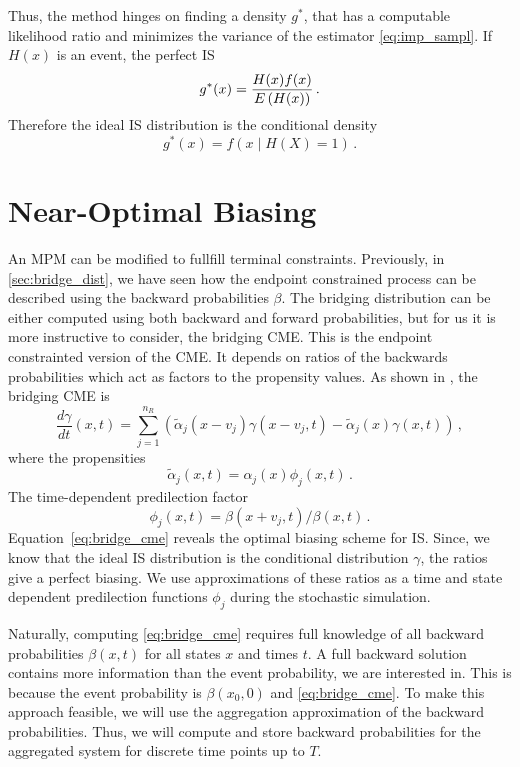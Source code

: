 Thus, the method hinges on finding a density $g^{*}$, that has a computable likelihood ratio and  minimizes the variance of the estimator \eqref{eq:imp_sampl}.
If $H(x)$ is an event, the perfect \ac{IS} \parencite[Chapter~9.7.1]{kroese2013handbook}
\[
    g^*(x) = \frac{H(x) f(x)}{{E}\left(H(x)\right)}\,.
\]
Therefore the ideal \ac{IS} distribution is the conditional density
\[
    g^*(x) = f(x \mid H(X) = 1)\,.
\]

\section{Near-Optimal Biasing}
An \ac{MPM} can be modified to fullfill terminal constraints.
Previously, in \autoref{sec:bridge_dist}, we have seen how the endpoint constrained process can be described using the backward probabilities $\beta$.
The bridging distribution can be either computed using both backward and forward probabilities, but for us it is more instructive to consider, the bridging \ac{CME}.
This is the endpoint constrainted version of the \ac{CME}.
It depends on ratios of the backwards probabilities which act as factors to the propensity values.
As shown in \citet{huang2016reconstructing}, the bridging \ac{CME} is
\begin{equation}\label{eq:bridge_cme}
    \frac{d\gamma}{d t} ( x,t) =
    \sum_{j=1}^{n_R}\left(
        \tilde{\alpha}_j( x- v_j)\gamma( x- v_j,t) - \tilde{\alpha}_j( x)\gamma( x,t)
    \right)\,,
\end{equation}
where the propensities
\begin{equation}
    \tilde{\alpha}_j(x, t) = \alpha_j(x)\phi_j(x, t)\,.
\end{equation}
The time-dependent predilection factor
\begin{equation*}
    \phi_j(x, t) = {\beta(x + v_j, t)}/{\beta(x, t)}\,.
\end{equation*}
Equation~\eqref{eq:bridge_cme} reveals the optimal biasing scheme for \ac{IS}.
Since, we know that the ideal \ac{IS} distribution is the conditional distribution $\gamma$, the ratios
give a perfect biasing.
We use approximations of these ratios as a time and state dependent predilection functions $\phi_j$ during the stochastic simulation.

Naturally, computing \eqref{eq:bridge_cme} requires full knowledge of all backward probabilities $\beta(x, t)$ for all states $x$ and times $t$.
A full backward solution contains more information than the event probability, we are interested in.
This is because the event probability is $\beta(x_0, 0)$ and \eqref{eq:bridge_cme}.
To make this approach feasible, we will use the aggregation approximation of the backward probabilities.
Thus, we will compute and store backward probabilities for the aggregated system for discrete time points up to $T$.


